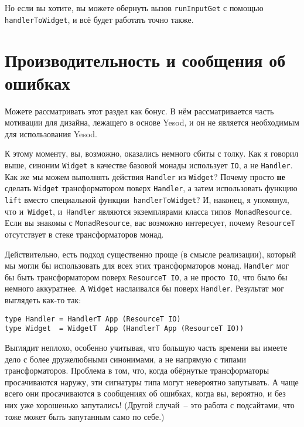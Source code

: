 Но если вы хотите, вы можете обернуть вызов \lstinline'runInputGet' с помощью
\lstinline'handlerToWidget', и всё будет работать точно также.

\section{Производительность и сообщения об ошибках}
\begin{remark}
    Можете рассматривать этот раздел как бонус. В нём рассматривается часть
    мотивации для дизайна, лежащего в основе Yesod, и он не является
    необходимым для использования Yesod.
\end{remark}

К этому моменту, вы, возможно, оказались немного сбиты с толку. Как я говорил
выше, синоним \lstinline'Widget' в качестве базовой
монады использует \lstinline'IO', а не \lstinline'Handler'. Как же мы можем
выполнять действия \lstinline'Handler' из \lstinline'Widget'? Почему просто 
\textbf{не} сделать \lstinline'Widget' трансформатором поверх
\lstinline'Handler', а затем использовать функцию \lstinline'lift' вместо
специальной функции~\lstinline'handlerToWidget'? И, наконец, я упомянул, что
и~\lstinline'Widget', и~\lstinline'Handler' являются экземплярами класса
типов~\lstinline'MonadResource'. Если вы знакомы с \lstinline'MonadResource',
вас возможно интересует, почему \lstinline'ResourceT' отсутствует в стеке
трансформаторов монад.

Действительно, есть подход существенно проще (в смысле реализации), который мы
могли бы использовать для всех этих трансформаторов монад. \lstinline'Handler'
мог бы быть трансформатором поверх \lstinline'ResourceT IO', а не
просто~\lstinline'IO', что было бы немного аккуратнее. А \lstinline'Widget'
наслаивался бы поверх \lstinline'Handler'. Результат мог выглядеть как-то так:
\begin{lstlisting}
type Handler = HandlerT App (ResourceT IO)
type Widget  = WidgetT  App (HandlerT App (ResourceT IO))
\end{lstlisting}

Выглядит неплохо, особенно учитывая, что большую часть времени вы имеете дело с
более дружелюбными синонимами, а не напрямую с типами трансформаторов. Проблема
в том, что, когда обёрнутые трансформаторы просачиваются наружу,
эти сигнатуры типа могут невероятно запутывать. А чаще всего они просачиваются
в сообщениях об ошибках, когда вы, вероятно, и без них уже хорошенько
запутались! (Другой случай~-- это работа с подсайтами, что тоже может быть
запутанным само по себе.)

